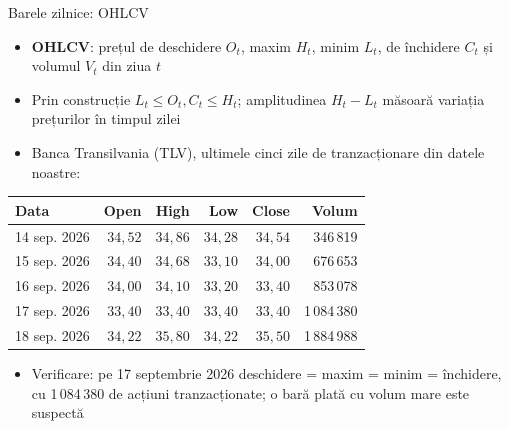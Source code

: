 \begin{frame}{Barele zilnice: OHLCV}
\itemsize{\footnotesize}
\begin{itemize}
    \item \textbf{OHLCV}: prețul de deschidere $O_t$, maxim $H_t$, minim $L_t$, de închidere $C_t$ și volumul $V_t$ din ziua $t$
    \item Prin construcție $L_t \le O_t, C_t \le H_t$; amplitudinea $H_t - L_t$ măsoară variația prețurilor în timpul zilei
    \item Banca Transilvania (TLV), ultimele cinci zile de tranzacționare din datele noastre:
\end{itemize}\begin{center}
\footnotesize
\begin{tabular}{lrrrrr}
\toprule
Data & Open & High & Low & Close & Volum \\
\midrule
14 sep. 2026 & $34{,}52$ & $34{,}86$ & $34{,}28$ & $34{,}54$ & 346\,819 \\
15 sep. 2026 & $34{,}40$ & $34{,}68$ & $33{,}10$ & $34{,}00$ & 676\,653 \\
16 sep. 2026 & $34{,}00$ & $34{,}10$ & $33{,}20$ & $33{,}40$ & 853\,078 \\
17 sep. 2026 & $33{,}40$ & $33{,}40$ & $33{,}40$ & $33{,}40$ & 1\,084\,380 \\
18 sep. 2026 & $34{,}22$ & $35{,}80$ & $34{,}22$ & $35{,}50$ & 1\,884\,988 \\
\bottomrule
\end{tabular}
\end{center}
\begin{itemize}
    \item Verificare: pe 17 septembrie 2026 deschidere = maxim = minim = închidere, cu 1\,084\,380 de acțiuni tranzacționate; o bară plată cu volum mare este suspectă
\end{itemize}
\end{frame}

